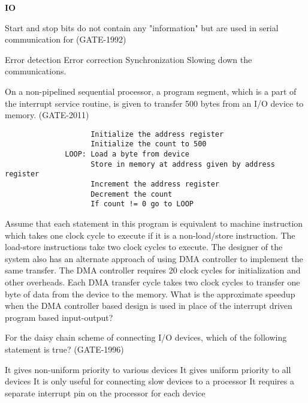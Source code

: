
\centerline{\textbf{ \LARGE IO }}

\begin{questyle}
  \question  Start and stop bits do not contain any "information" but are used in serial communication for  (GATE-1992)

  \begin{choices}
    \choice         Error detection
    \choice         Error correction
    \CorrectChoice  Synchronization
    \choice         Slowing down the communications.
  \end{choices}
\end{questyle}

\begin{questyle}
  \question  On a non-pipelined sequential processor, a program segment, which is a part of the
             interrupt service routine, is given to transfer 500 bytes from an I/O device to memory.  (GATE-2011)
              \begin{lstlisting}
                    Initialize the address register
                    Initialize the count to 500
              LOOP: Load a byte from device
                    Store in memory at address given by address register
                    Increment the address register
                    Decrement the count
                    If count != 0 go to LOOP
              \end{lstlisting}
              Assume that each statement in this program is equivalent to machine instruction which
              takes one clock cycle to execute if it is a non-load/store instruction. The load-store
              instructions take two clock cycles to execute. The designer of the system also has an
              alternate approach of using DMA controller to implement the same transfer. The DMA
              controller requires 20 clock cycles for initialization and other overheads. Each DMA
              transfer cycle takes two clock cycles to transfer one byte of data from the device to
              the memory. What is the approximate speedup when the DMA controller based design is
              used in place of the interrupt driven program based input-output?
  \begin{choices}
  \end{choices}
\end{questyle}


\begin{questyle}
  \question  For the daisy chain scheme of connecting I/O devices, which of the following statement is true?  (GATE-1996)

  \begin{choices}
    \CorrectChoice  It gives non-uniform priority to various devices
    \choice         It gives uniform priority to all devices
    \choice         It is only useful for connecting slow devices to a processor
    \choice         It requires a separate interrupt pin on the processor for each device
  \end{choices}
\end{questyle}

